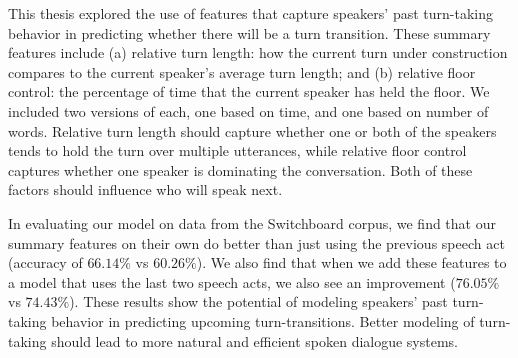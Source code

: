 This thesis explored the use of features that capture speakers' past turn-taking behavior in predicting whether there will be a turn transition.  These summary features include (a) relative turn length: how the current turn under construction compares to the current speaker's average turn length; and (b) relative floor control: the percentage of time that the current speaker has held the floor.  We included two versions of each, one based on time, and one based on number of words.
%
Relative turn length should capture whether one or both of the speakers tends to hold the turn over multiple utterances, while relative floor control captures whether one speaker is dominating the conversation.  Both of these factors should influence who will speak next.

In evaluating our model on data from the Switchboard corpus, we find that our summary features on their own do better than just using the previous speech act (accuracy of $66.14\%$ vs $60.26\%$).  We also find that when we add these features to a model that uses the last two speech acts, we also see an improvement ($76.05\%$ vs $74.43\%$).  These results show the potential of modeling speakers' past turn-taking behavior in predicting upcoming turn-transitions.  Better modeling of turn-taking should lead to more natural and efficient spoken dialogue systems.
